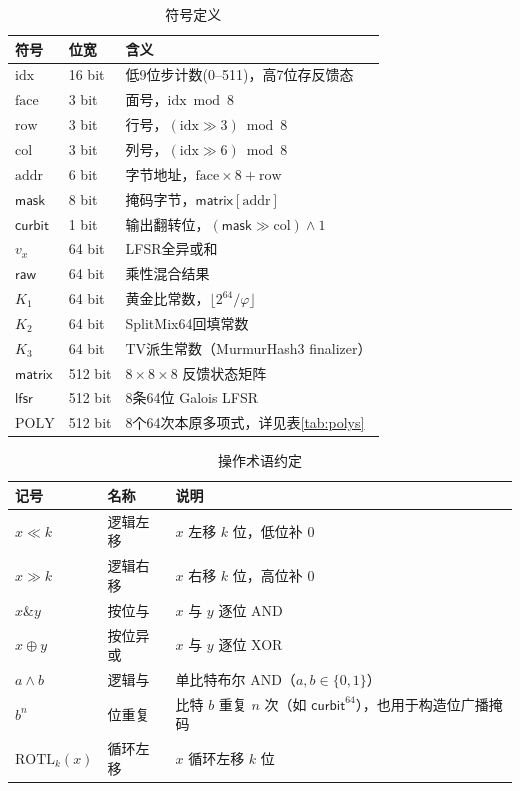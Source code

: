 \documentclass[11pt,a4paper]{ctexart}
\begin{document}
\begin{table}[H]
\centering
\begin{tabular}{@{}lll@{}}
\toprule
\textbf{符号} & \textbf{位宽} & \textbf{含义} \\
\midrule
$\mathrm{idx}$   & 16 bit & 低9位步计数(0--511)，高7位存反馈态 \\
$\mathrm{face}$  & 3 bit  & 面号，$\mathrm{idx} \bmod 8$ \\
$\mathrm{row}$   & 3 bit  & 行号，$(\mathrm{idx} \gg 3) \bmod 8$ \\
$\mathrm{col}$   & 3 bit  & 列号，$(\mathrm{idx} \gg 6) \bmod 8$ \\
$\mathrm{addr}$  & 6 bit  & 字节地址，$\mathrm{face} \times 8 + \mathrm{row}$ \\
$\mathsf{mask}$  & 8 bit  & 掩码字节，$\mathsf{matrix}[\mathrm{addr}]$ \\
$\mathsf{curbit}$ & 1 bit & 输出翻转位，$(\mathsf{mask} \gg \mathrm{col}) \land 1$ \\
$v_x$            & 64 bit & LFSR全异或和 \\
$\mathsf{raw}$   & 64 bit & 乘性混合结果 \\
$K_1$            & 64 bit & 黄金比常数，$\lfloor 2^{64}/\varphi \rfloor$ \\
$K_2$            & 64 bit & SplitMix64回填常数 \\
$K_3$            & 64 bit & TV派生常数（MurmurHash3 finalizer）\\
$\mathsf{matrix}$ & 512 bit & $8\times8\times8$ 反馈状态矩阵 \\
$\mathsf{lfsr}$  & 512 bit & 8条64位 Galois LFSR \\
$\mathrm{POLY}$  & 512 bit & 8个64次本原多项式，详见表\ref{tab:polys} \\
\bottomrule
\end{tabular}
\caption{符号定义}
\label{tab:symbols}
\end{table}

\begin{table}[H]
\centering
\begin{tabular}{@{}lll@{}}
\toprule
\textbf{记号} & \textbf{名称} & \textbf{说明} \\
\midrule
$x \ll k$   & 逻辑左移  & $x$ 左移 $k$ 位，低位补 0 \\
$x \gg k$   & 逻辑右移  & $x$ 右移 $k$ 位，高位补 0 \\
$x \mathbin{\&} y$ & 按位与    & $x$ 与 $y$ 逐位 AND \\
$x \oplus y$ & 按位异或  & $x$ 与 $y$ 逐位 XOR \\
$a \land b$ & 逻辑与    & 单比特布尔 AND（$a,b\in\{0,1\}$）\\
$b^{n}$      & 位重复    & 比特 $b$ 重复 $n$ 次（如 $\mathsf{curbit}^{64}$），也用于构造位广播掩码 \\
$\mathrm{ROTL}_k(x)$ & 循环左移 & $x$ 循环左移 $k$ 位 \\
\bottomrule
\end{tabular}
\caption{操作术语约定}
\label{tab:notation}
\end{table}
\end{document}
